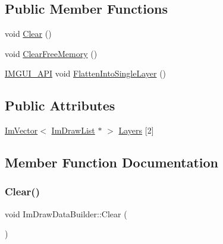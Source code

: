\subsection*{Public Member Functions}
\begin{DoxyCompactItemize}
\item 
void \mbox{\hyperlink{struct_im_draw_data_builder_a5306e78438b48a74f2d65d0e10d36d53}{Clear}} ()
\item 
void \mbox{\hyperlink{struct_im_draw_data_builder_a469040fce189f1225043171a3b58420d}{Clear\+Free\+Memory}} ()
\item 
\mbox{\hyperlink{imgui_8h_a43829975e84e45d1149597467a14bbf5}{I\+M\+G\+U\+I\+\_\+\+A\+PI}} void \mbox{\hyperlink{struct_im_draw_data_builder_a3893445f97c62e9755fa61e37b698487}{Flatten\+Into\+Single\+Layer}} ()
\end{DoxyCompactItemize}
\subsection*{Public Attributes}
\begin{DoxyCompactItemize}
\item 
\mbox{\hyperlink{class_im_vector}{Im\+Vector}}$<$ \mbox{\hyperlink{struct_im_draw_list}{Im\+Draw\+List}} $\ast$ $>$ \mbox{\hyperlink{struct_im_draw_data_builder_a2d03f8c80dac68fc0e2565dd79307dea}{Layers}} \mbox{[}2\mbox{]}
\end{DoxyCompactItemize}


\subsection{Member Function Documentation}
\mbox{\label{struct_im_draw_data_builder_a5306e78438b48a74f2d65d0e10d36d53}} 
\subsubsection{\texorpdfstring{Clear()}{Clear()}}
{\footnotesize\ttfamily void Im\+Draw\+Data\+Builder\+::\+Clear (\begin{DoxyParamCaption}{ }\end{DoxyParamCaption})\hspace{0.3cm}{\ttfamily [inline]}}


